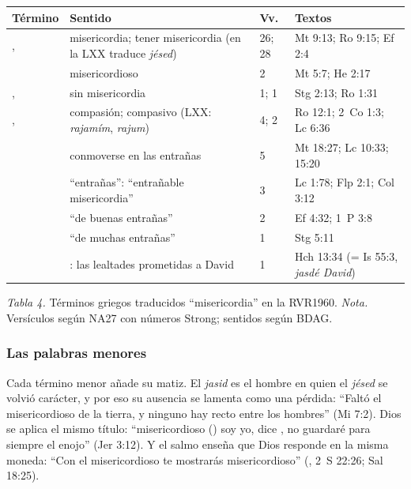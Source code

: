 \begin{center}\small\renewcommand{\arraystretch}{1.2}
\begin{tabular}{@{}L{3.6cm}L{4.8cm}L{1.3cm}L{4.6cm}@{}}
\toprule
\textbf{Término} & \textbf{Sentido} & \textbf{Vv.} & \textbf{Textos} \\ \midrule
{},  & misericordia; tener misericordia (en la LXX traduce \emph{jésed}) & 26; 28 & Mt 9:13; Ro 9:15; Ef 2:4 \\
 & misericordioso & 2 & Mt 5:7; He 2:17 \\
,  & sin misericordia & 1; 1 & Stg 2:13; Ro 1:31 \\
,  & compasión; compasivo (LXX: \emph{rajamím}, \emph{rajum}) & 4; 2 & Ro 12:1; 2~Co 1:3; Lc 6:36 \\
 & conmoverse en las entrañas & 5 & Mt 18:27; Lc 10:33; 15:20 \\
 & ``entrañas'': ``entrañable misericordia'' & 3 & Lc 1:78; Flp 2:1; Col 3:12 \\
 & ``de buenas entrañas'' & 2 & Ef 4:32; 1~P 3:8 \\
 & ``de muchas entrañas'' & 1 & Stg 5:11 \\
 & : las lealtades prometidas a David & 1 & Hch 13:34 (= Is 55:3, \emph{jasdé David}) \\
\bottomrule
\end{tabular}\par
{\footnotesize\color{gris}\textit{Tabla 4.} Términos griegos traducidos ``misericordia'' en la RVR1960. \textit{Nota.} Versículos según NA27 con números Strong; sentidos según BDAG.}
\end{center}


\subsubsection*{Las palabras menores}
Cada término menor añade su matiz. El \emph{jasid} es el hombre en quien el \emph{jésed} se volvió carácter, y por eso su ausencia se lamenta como una pérdida: ``Faltó el misericordioso de la tierra, y ninguno hay recto entre los hombres'' (Mi 7:2). Dios se aplica el mismo título: ``misericordioso () soy yo, dice \SENOR, no guardaré para siempre el enojo'' (Jer 3:12). Y el salmo enseña que Dios responde en la misma moneda: ``Con el misericordioso te mostrarás misericordioso'' (, 2~S 22:26; Sal 18:25).


